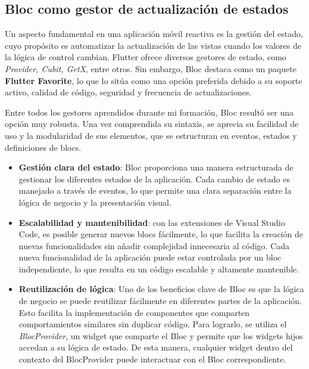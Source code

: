 	\subsection{Bloc como gestor de actualización de estados}
	Un aspecto fundamental en una aplicación móvil reactiva es la gestión del estado, cuyo propósito es automatizar la actualización de las vistas cuando los valores de la lógica de control cambian. Flutter ofrece diversos gestores de estado, como \textit{Provider, Cubit, GetX}, entre otros. Sin embargo, Bloc destaca como un paquete \textbf{Flutter Favorite}, lo que lo sitúa como una opción preferida debido a su soporte activo, calidad de código, seguridad y frecuencia de actualizaciones.
	
	Entre todos los gestores aprendidos durante mi formación, Bloc resultó ser una opción muy robusta. Una vez comprendida su sintaxis, se aprecia su facilidad de uso y la modularidad de sus elementos, que se estructuran en eventos, estados y definiciones de blocs.
	\begin{itemize}
		
		\item \textbf{Gestión clara del estado}: Bloc proporciona una manera estructurada de gestionar los diferentes estados de la aplicación. Cada cambio de estado es manejado a través de eventos, lo que permite una clara separación entre la lógica de negocio y la presentación visual.
		
		\item \textbf{Escalabilidad y mantenibilidad}: con las extensiones de Visual Studio Code, es posible generar nuevos blocs fácilmente, lo que facilita la creación de nuevas funcionalidades sin añadir complejidad innecesaria al código. Cada nueva funcionalidad de la aplicación puede estar controlada por un bloc independiente, lo que resulta en un código escalable y altamente mantenible.
				
		\item \textbf{Reutilización de lógica}: Uno de los beneficios clave de Bloc es que la lógica de negocio se puede reutilizar fácilmente en diferentes partes de la aplicación. Esto facilita la implementación de componentes que comparten comportamientos similares sin duplicar código. Para lograrlo, se utiliza el \textit{BlocProvider}, un widget que comparte el Bloc y permite que los widgets hijos accedan a su lógica de estado. De esta manera, cualquier widget dentro del contexto del BlocProvider puede interactuar con el Bloc correspondiente.
						
	\end{itemize}
	
